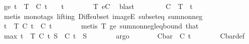 \begin{isabellebody}
\ ge{\isacharunderscore}{\kern0pt}{}{\isacharcolon}{\kern0pt}\ {\isachardoublequoteopen}t\ {\isasymin}\ T\ {\isasymLongrightarrow}\ C\ t\ {\isasymge}\ {}{\isachardoublequoteclose}\ \ t\isanewline
\ \ \ \ \ \ \isamarkupfalse%
\ T{\isacharparenleft}{\kern0pt}{}{\isacharparenright}{\kern0pt}\ eC\ \isamarkupfalse%
\ blast\isanewline
\ \ \ \ \isamarkupfalse%
\ \isamarkupfalse%
\ {\isachardoublequoteopen}{\isasymSum}\ {\isacharparenleft}{\kern0pt}C\ {\isacharbackquote}{\kern0pt}\ {\isacharparenleft}{\kern0pt}T\ {\isacharminus}{\kern0pt}\ {\isacharbraceleft}{\kern0pt}t{\isacharbraceright}{\kern0pt}{\isacharparenright}{\kern0pt}{\isacharparenright}{\kern0pt}\ {\isasymge}\ {}{\isachardoublequoteclose}\isanewline
\ \ \ \ \ \ \isamarkupfalse%
\ {\isacharparenleft}{\kern0pt}metis\ {\isacharparenleft}{\kern0pt}mono{\isacharunderscore}{\kern0pt}tags{\isacharcomma}{\kern0pt}\ lifting{\isacharparenright}{\kern0pt}\ Diff{\isacharunderscore}{\kern0pt}subset\ imageE\ subset{\isacharunderscore}{\kern0pt}eq\ sum{\isacharunderscore}{\kern0pt}nonneg{\isacharparenright}{\kern0pt}\isanewline
\ \ \ \ \isamarkupfalse%
\ \isamarkupfalse%
\ {\isachardoublequoteopen}{\isacharparenleft}{\kern0pt}{\isasymSum}t\ {\isasymin}\ T{\isachardot}{\kern0pt}\ C\ t{\isacharparenright}{\kern0pt}\ {\isasymge}\ C\ t{\isachardoublequoteclose}\isanewline
\ \ \ \ \ \ \isamarkupfalse%
\ {\isacharparenleft}{\kern0pt}metis\ T{\isacharparenleft}{\kern0pt}{}{\isacharparenright}{\kern0pt}\ ge{\isacharunderscore}{\kern0pt}{}\ sum{\isacharunderscore}{\kern0pt}nonneg{\isacharunderscore}{\kern0pt}leq{\isacharunderscore}{\kern0pt}bound\ that{\isacharparenright}{\kern0pt}\isanewline
\ \ \ \ \isamarkupfalse%
\ \isamarkupfalse%
\ {\isachardoublequoteopen}max\ {\isacharparenleft}{\kern0pt}{\isacharparenleft}{\kern0pt}{\isasymSum}t\ {\isasymin}\ T{\isachardot}{\kern0pt}\ C\ t{\isacharparenright}{\kern0pt}{\isacharparenright}{\kern0pt}\ S\ {\isasymge}\ C\ t{\isachardoublequoteclose}\ \ S\isanewline
\ \ \ \ \ \ \isamarkupfalse%
\ argo\isanewline
\ \ \ \ \isamarkupfalse%
\ \isamarkupfalse%
\ {\isachardoublequoteopen}C{\isacharunderscore}{\kern0pt}bar\ {\isasymge}\ C\ t{\isachardoublequoteclose}\isanewline
\ \ \ \ \ \ \isamarkupfalse%
\ C{\isacharunderscore}{\kern0pt}bar{\isacharunderscore}{\kern0pt}def\ \isamarkupfalse%

\end{isabellebody}
